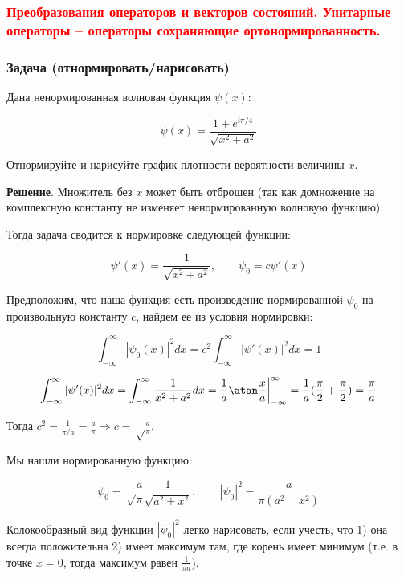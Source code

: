 \subsubsection{\textcolor{red}{Преобразования операторов и векторов состояний. Унитарные операторы – операторы сохраняющие ортонормированность.}}


\subsubsection{Задача (отнормировать/нарисовать)}\hypertarget{section-3}{}\label{section-3}

Дана ненормированная волновая функция $\psi(x)$:

\begin{displaymath}
\psi(x)=\frac{1+e^{i\pi/4}}{\sqrt{x^2+a^2}}
\end{displaymath}

Отнормируйте и нарисуйте график плотности вероятности величины $x$.

\textbf{Решение}. Множитель без \guillemotleft{}$x$\guillemotright{} может быть отброшен (так как домножение на комплексную константу не изменяет ненормированную волновую функцию). 

Тогда задача сводится к нормировке следующей функции:

\begin{displaymath}
\psi'(x)=\frac{1}{\sqrt{x^2+a^2}},\qquad \psi_0=c\psi'(x)
\end{displaymath}

Предположим, что наша функция есть произведение нормированной $\psi_0$ на произвольную константу $c$, найдем ее из условия нормировки:

\begin{displaymath}
\int_{-\infty}^{\infty}|\psi_0(x)|^2 dx=
c^2\int_{-\infty}^{\infty}|\psi'(x)|^2 dx=1
\end{displaymath}

\begin{displaymath}
\int_{-\infty}^{\infty}|\psi'(x)|^2 dx=
\int_{-\infty}^{\infty} \frac{1}{x^2+a^2} dx= \frac{1}{a}\atan\frac{x}{a}\bigg|_{-\infty}^{\infty}=
\frac{1}{a}(\frac\pi2+\frac\pi2)=\frac{\pi}{a}
\end{displaymath}

Тогда  $c^2=\frac{1}{\pi/a}=\frac{a}{\pi} \Rightarrow c=\sqrt\frac{a}{\pi}$.

Мы нашли нормированную функцию:

\begin{displaymath}
\psi_0=\sqrt\frac{a}{\pi}\frac{1}{\sqrt{a^2+x^2}},\qquad
|\psi_0|^2=\frac{a}{\pi(a^2+x^2)}
\end{displaymath}

Колокообразный вид функции $|\psi_0|^2$ легко нарисовать,  если учесть, что 1) она всегда положительна 2) имеет максимум там, где корень имеет минимум (т.е. в точке $x=0$, тогда максимум равен $\frac{1}{\pi a}$).

